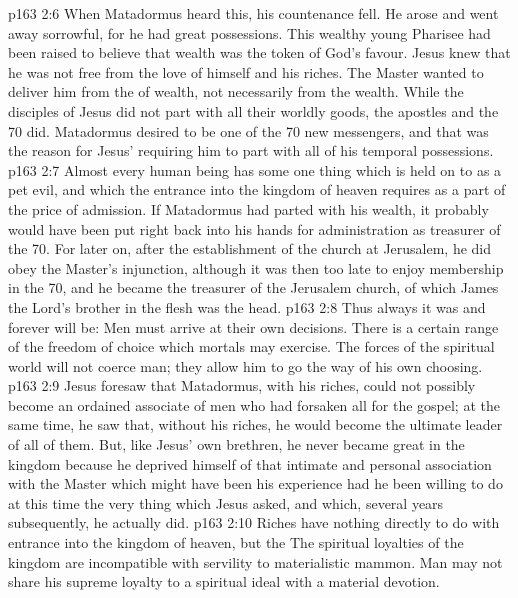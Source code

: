 \vs p163 2:6 When Matadormus heard this, his countenance fell. He arose and went away sorrowful, for he had great possessions. This wealthy young Pharisee had been raised to believe that wealth was the token of God’s favour. Jesus knew that he was not free from the love of himself and his riches. The Master wanted to deliver him from the  of wealth, not necessarily from the wealth. While the disciples of Jesus did not part with all their worldly goods, the apostles and the 70 did. Matadormus desired to be one of the 70 new messengers, and that was the reason for Jesus’ requiring him to part with all of his temporal possessions.
\vs p163 2:7 \pc Almost every human being has some one thing which is held on to as a pet evil, and which the entrance into the kingdom of heaven requires as a part of the price of admission. If Matadormus had parted with his wealth, it probably would have been put right back into his hands for administration as treasurer of the 70. For later on, after the establishment of the church at Jerusalem, he did obey the Master’s injunction, although it was then too late to enjoy membership in the 70, and he became the treasurer of the Jerusalem church, of which James the Lord’s brother in the flesh was the head.
\vs p163 2:8 Thus always it was and forever will be: Men must arrive at their own decisions. There is a certain range of the freedom of choice which mortals may exercise. The forces of the spiritual world will not coerce man; they allow him to go the way of his own choosing.
\vs p163 2:9 Jesus foresaw that Matadormus, with his riches, could not possibly become an ordained associate of men who had forsaken all for the gospel; at the same time, he saw that, without his riches, he would become the ultimate leader of all of them. But, like Jesus’ own brethren, he never became great in the kingdom because he deprived himself of that intimate and personal association with the Master which might have been his experience had he been willing to do at this time the very thing which Jesus asked, and which, several years subsequently, he actually did.
\vs p163 2:10 Riches have nothing directly to do with entrance into the kingdom of heaven, but the  The spiritual loyalties of the kingdom are incompatible with servility to materialistic mammon. Man may not share his supreme loyalty to a spiritual ideal with a material devotion.
